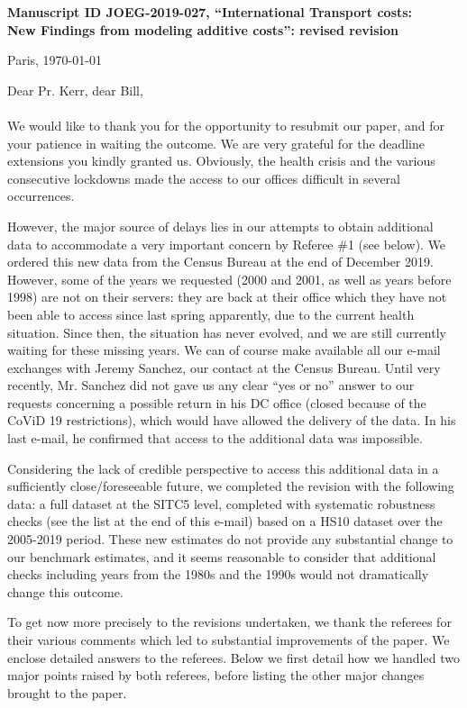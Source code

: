 \documentclass[12pt]{article}
\begin{document}
\noindent \textbf{Manuscript ID JOEG-2019-027, ``International Transport costs:\\New Findings from modeling additive costs'': revised revision}

\bigskip
\bigskip

\hfill Paris, \today

\bigskip
\noindent Dear Pr. Kerr, dear Bill, \\
\\
\noindent \noindent We would like to thank you for the opportunity to resubmit our paper, and for your patience in waiting the outcome. We are very grateful for the deadline extensions you kindly granted us. Obviously, the health crisis and the various consecutive lockdowns made the access to our offices difficult in several occurrences. \medskip

However, the major source of delays lies in our attempts to obtain additional data to accommodate a very important concern by Referee \#1 (see below). We ordered this new data from the Census Bureau at the end of December 2019. However, some of the years we requested (2000 and 2001, as well as years before 1998) are not on their servers: they are back at their office which they have not been able to access since last spring apparently, due to the current health situation. Since then, the situation has never evolved, and we are still currently waiting for these missing years. We can of course make available all our e-mail exchanges with Jeremy Sanchez, our contact at the Census Bureau. Until very recently, Mr. Sanchez did not gave us any clear “yes or no” answer to our requests concerning a possible return in his DC office (closed because of the CoViD 19 restrictions), which would have allowed the delivery of the data. In his last e-mail, he confirmed that access to the additional data was impossible.\medskip

Considering the lack of credible perspective to access this additional data in a sufficiently close/foreseeable future, we completed the revision with the following data: a full dataset at the SITC5 level, completed with systematic robustness checks (see the list at the end of this e-mail) based on a HS10 dataset over the 2005-2019 period. These new estimates do not provide any substantial change to our benchmark estimates, and it seems reasonable to consider that additional checks including years from the 1980s and the 1990s would not dramatically change this outcome. \medskip

To get now more precisely to the revisions undertaken, we thank the referees for their various comments which led to substantial improvements of the paper. We enclose detailed answers to the referees. Below we first detail how we handled two major points raised by both referees, before listing the other major changes brought to the paper.
\end{document}
